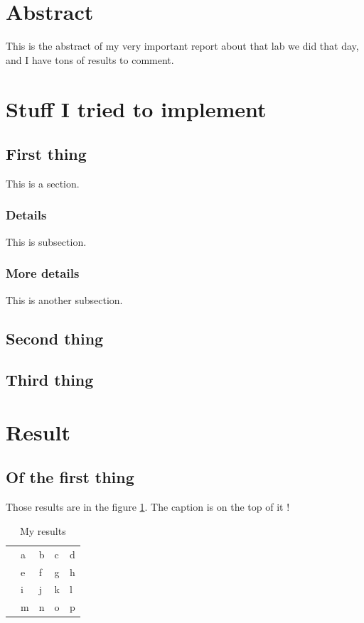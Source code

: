 \documentclass{cranfieldChart}
\begin{document}

\section*{Abstract}
This is the abstract of my very important report about that lab we did that day, and I have tons of results to comment. 
\newpage
\tableofcontents
\newpage
\listoffigures
\newpage
\listoftables
\newpage
\section{Stuff I tried to implement}
\subsection{First thing}
This is a section.
\subsubsection{Details}
This is subsection.
\subsubsection{More details}
This is another subsection.
\subsection{Second thing}
\subsection{Third thing}
\newpage
\section{Result}
\subsection{Of the first thing}
Those results are in the figure \ref{resuts}. The caption is on the top of it !
\begin{table}[!h]
	\centering
	\caption{My results}
	\label{resuts}
	\begin{tabular}{lllll}
		& a  & b  & c & d \\
		& e & f & g & h \\
		& i & j & k & l \\
		& m & n & o & p
	\end{tabular}
\end{table}
\end{document}

